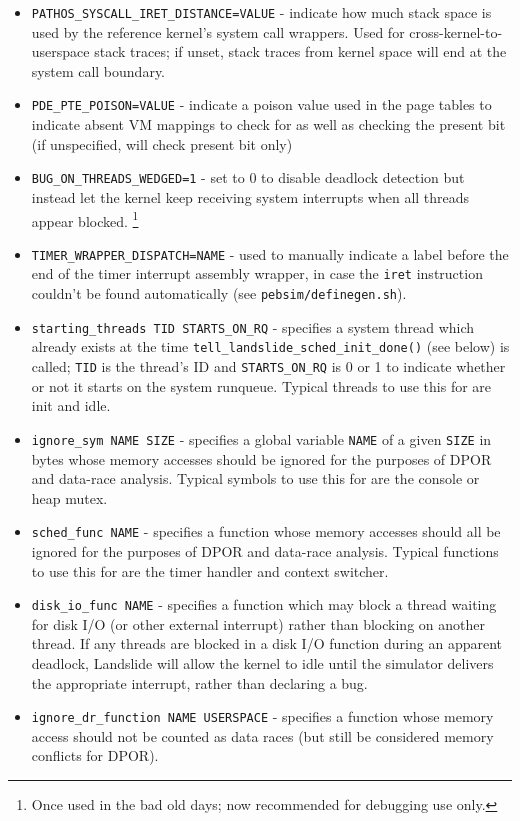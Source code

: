 \begin{itemize}
	\item {\tt PATHOS\_SYSCALL\_IRET\_DISTANCE=VALUE} - indicate how much stack space is used by the reference kernel's system call wrappers.
		Used for cross-kernel-to-userspace stack traces;
		if unset, stack traces from kernel space will end at the system call boundary.
	\item {\tt PDE\_PTE\_POISON=VALUE} - indicate a poison value used in the page tables to indicate absent VM mappings to check for as well as checking the present bit (if unspecified, will check present bit only)
	\item {\tt BUG\_ON\_THREADS\_WEDGED=1} - set to 0 to disable deadlock detection but instead let the kernel keep receiving system interrupts when all threads appear blocked.%
		\footnote{Once used in the bad old days; now recommended for debugging use only.}
	\item {\tt TIMER\_WRAPPER\_DISPATCH=NAME} - used to manually indicate a label before the end of the timer interrupt assembly wrapper, in case the {\tt iret} instruction couldn't be found automatically (see {\tt pebsim/definegen.sh}).
	\item {\tt starting\_threads TID STARTS\_ON\_RQ} - specifies a system thread which already exists at the time {\tt tell\_landslide\_sched\_init\_done()} (see below) is called; {\tt TID} is the thread's ID and {\tt STARTS\_ON\_RQ} is 0 or 1 to indicate whether or not it starts on the system runqueue.
		Typical threads to use this for are init and idle.
	\item {\tt ignore\_sym NAME SIZE} - specifies a global variable {\tt NAME} of a given {\tt SIZE} in bytes whose memory accesses should be ignored for the purposes of DPOR and data-race analysis.
		Typical symbols to use this for are the console or heap mutex.
	\item {\tt sched\_func NAME} - specifies a function whose memory accesses should all be ignored for the purposes of DPOR and data-race analysis.
		Typical functions to use this for are the timer handler and context switcher.
	\item {\tt disk\_io\_func NAME} - specifies a function which may block a thread waiting for disk I/O (or other external interrupt) rather than blocking on another thread.
		If any threads are blocked in a disk I/O function during an apparent deadlock,
		Landslide will allow the kernel to idle until the simulator delivers the appropriate interrupt,
		rather than declaring a bug.
	\item {\tt ignore\_dr\_function NAME USERSPACE} - specifies a function whose memory access should not be counted as data races (but still be considered memory conflicts for DPOR).

\end{itemize}
